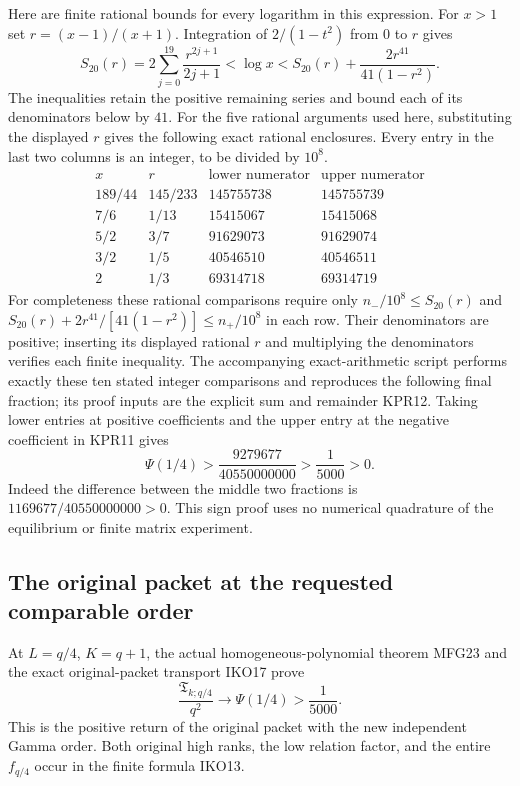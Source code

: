 \documentclass[11pt,a4paper]{article}
\begin{document}
Here are finite rational bounds for every logarithm in this expression.
For $x>1$ set $r=(x-1)/(x+1)$. Integration of
$2/(1-t^2)$ from $0$ to $r$ gives
\[
 S_{20}(r)=2\sum_{j=0}^{19}\frac{r^{2j+1}}{2j+1}
 <\log x
 <S_{20}(r)+\frac{2r^{41}}{41(1-r^2)}.
 \tag{KPR12}
\]
The inequalities retain the positive remaining series and bound
each of its denominators below by $41$. For the five rational
arguments used here, substituting the displayed $r$ gives the
following exact rational enclosures. Every entry in the last two
columns is an integer, to be divided by $10^8$.
\[
 \begin{array}{c|c|r|r}
 x&r&\text{lower numerator}&\text{upper numerator}\\\hline
 189/44&145/233&145755738&145755739\\
 7/6&1/13&15415067&15415068\\
 5/2&3/7&91629073&91629074\\
 3/2&1/5&40546510&40546511\\
 2&1/3&69314718&69314719
 \end{array}
 \tag{KPR13}
\]
For completeness these rational comparisons require only
$n_-/10^8\leq S_{20}(r)$ and
$S_{20}(r)+2r^{41}/[41(1-r^2)]\leq n_+/10^8$ in each row.
Their denominators are positive; inserting its displayed rational
$r$ and multiplying the denominators verifies each finite inequality.
The accompanying exact-arithmetic script performs exactly these ten
stated integer comparisons and reproduces the following final
fraction; its proof inputs are the explicit sum and remainder KPR12.
Taking lower entries at positive coefficients and the upper entry
at the negative coefficient in KPR11 gives
\[
 \boxed{\Psi(1/4)>\frac{9279677}{40550000000}
                     >\frac1{5000}>0.}
 \tag{KPR14}
\]
Indeed the difference between the middle two fractions is
$1169677/40550000000>0$. This sign proof uses no numerical
quadrature of the equilibrium or finite matrix experiment.

\subsection{The original packet at the requested comparable order}
At $L=q/4$, $K=q+1$, the actual homogeneous-polynomial theorem MFG23
and the exact original-packet transport IKO17 prove
\[
 \boxed{\frac{\mathfrak T_{k;q/4}}{q^2}
           \longrightarrow\Psi(1/4)>\frac1{5000}.}
 \tag{KPR15}
\]
This is the positive return of the original packet with the new
independent Gamma order. Both original high ranks, the low relation
factor, and the entire $f_{q/4}$ occur in the finite formula IKO13.
\end{document}
